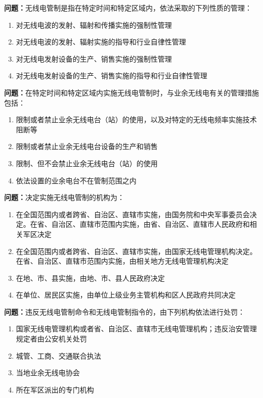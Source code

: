 \bigskip


\noindent\textbf{问题：}无线电管制是指在特定时间和特定区域内，依法采取的下列性质的管理：
\begin{enumerate}[label=\Alph*), leftmargin=3em]
\item 对无线电波的发射、辐射和传播实施的强制性管理
\item 对无线电波的发射、辐射实施的指导和行业自律性管理
\item 对无线电发射设备的生产、销售实施的强制性管理
\item 对无线电发射设备的生产、销售实施的指导和行业自律性管理
\end{enumerate}

\bigskip


\noindent\textbf{问题：}在特定时间和特定区域内实施无线电管制时，与业余无线电有关的管理措施包括：
\begin{enumerate}[label=\Alph*), leftmargin=3em]
\item 限制或者禁止业余无线电台（站）的使用，以及对特定的无线电频率实施技术阻断等
\item 限制或者禁止业余无线电台设备的生产和销售
\item 限制、但不会禁止业余无线电台（站）的使用
\item 依法设置的业余电台不在管制范围之内
\end{enumerate}

\bigskip


\noindent\textbf{问题：}决定实施无线电管制的机构为：
\begin{enumerate}[label=\Alph*), leftmargin=3em]
\item 在全国范围内或者跨省、自治区、直辖市实施，由国务院和中央军事委员会决定。在省、自治区、直辖市范围内实施，由省、自治区、直辖市人民政府和相关军区决定
\item 在全国范围内或者跨省、自治区、直辖市实施，由国家无线电管理机构决定。在省、自治区、直辖市范围内实施，由相关地方无线电管理机构决定
\item 在地、市、县实施，由地、市、县人民政府决定
\item 在单位、居民区实施，由单位上级业务主管机构和区人民政府共同决定
\end{enumerate}

\bigskip


\noindent\textbf{问题：}违反无线电管制命令和无线电管制指令的，由下列机构依法进行处罚：
\begin{enumerate}[label=\Alph*), leftmargin=3em]
\item 国家无线电管理机构或者省、自治区、直辖市无线电管理机构；违反治安管理规定者由公安机关处罚
\item 城管、工商、交通联合执法
\item 当地业余无线电协会
\item 所在军区派出的专门机构
\end{enumerate}

